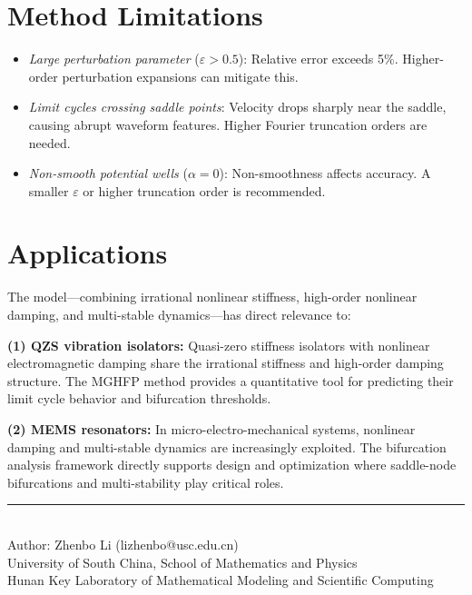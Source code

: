\documentclass[11pt,a4paper]{article}
\begin{document}
\section{Method Limitations}

\begin{itemize}[leftmargin=2em]
\item \textit{Large perturbation parameter} ($\varepsilon > 0.5$): Relative error exceeds 5\%. Higher-order perturbation expansions can mitigate this.
\item \textit{Limit cycles crossing saddle points}: Velocity drops sharply near the saddle, causing abrupt waveform features. Higher Fourier truncation orders are needed.
\item \textit{Non-smooth potential wells} ($\alpha = 0$): Non-smoothness affects accuracy. A smaller $\varepsilon$ or higher truncation order is recommended.
\end{itemize}

\section{Applications}

The model---combining irrational nonlinear stiffness, high-order nonlinear damping, and multi-stable dynamics---has direct relevance to:

\textbf{(1) QZS vibration isolators:} Quasi-zero stiffness isolators with nonlinear electromagnetic damping share the irrational stiffness and high-order damping structure. The MGHFP method provides a quantitative tool for predicting their limit cycle behavior and bifurcation thresholds.

\textbf{(2) MEMS resonators:} In micro-electro-mechanical systems, nonlinear damping and multi-stable dynamics are increasingly exploited. The bifurcation analysis framework directly supports design and optimization where saddle-node bifurcations and multi-stability play critical roles.

\vfill
\begin{center}
\small\rule{0.5\textwidth}{0.3pt}\\[4pt]
\small\color{primary} Author: Zhenbo Li (lizhenbo@usc.edu.cn)\\
\small University of South China, School of Mathematics and Physics\\
\small Hunan Key Laboratory of Mathematical Modeling and Scientific Computing
\end{center}
\end{document}
